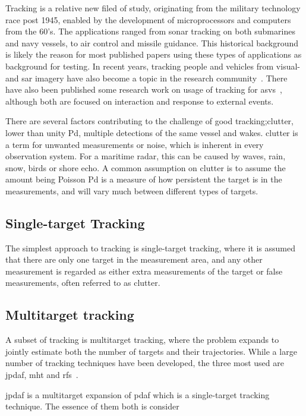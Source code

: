 Tracking is a relative new filed of study, originating from the military technology race post 1945, enabled by the development of microprocessors and computers from the 60's. The applications ranged from sonar tracking on both submarines and navy vessels, to air control and missile guidance. This historical background is likely the reason for most published papers using these types of applications as background for testing. In recent years, tracking people and vehicles from visual- and \gls{sar} imagery have also become a topic in the research community~\cite{Carthel2007,Carthel2007a,Coraluppi2000}. There have also been published some research work on usage of tracking for \glspl{asv}~\cite{Wolf2010,Svec2014}, although both are focused on interaction and response to external events.

There are several factors contributing to the challenge of good tracking;\gls{clutter}, lower than unity \gls{Pd}, multiple detections of the same vessel and wakes. \Gls{clutter} is a term for unwanted measurements or noise, which is inherent in every observation system. For a maritime radar, this can be caused by waves, rain, snow, birds or shore echo. A common assumption on clutter is to assume the amount being Poisson \gls{Pd} is a measure of how persistent the target is in the measurements, and will vary much  between different types of targets. 

\subsection{Single-target Tracking}
The simplest approach to tracking is single-target tracking, where it is assumed that there are only one target in the measurement area, and any other measurement is regarded as either extra measurements of the target or false measurements, often referred to as \gls{clutter}.

\subsection{Multitarget tracking}
A subset of tracking is multitarget tracking, where the problem expands to jointly estimate both the number of targets and their trajectories. While a large number of tracking techniques have been developed, the three most used are \gls{jpdaf}, \gls{mht} and \gls{rfs}~\cite{Vo2015}.

\gls{jpdaf} is a multitarget expansion of \gls{pdaf} which is a single-target tracking technique. The essence of them both is consider 


